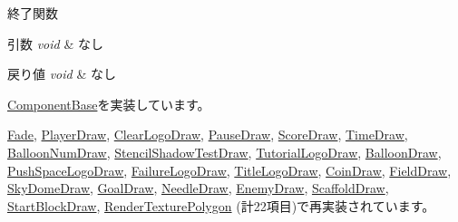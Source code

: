 終了関数 


\begin{DoxyParams}{引数}
{\em void} & なし \\
\hline
\end{DoxyParams}

\begin{DoxyRetVals}{戻り値}
{\em void} & なし \\
\hline
\end{DoxyRetVals}


\mbox{\hyperlink{class_component_base_a9f42beaf0383d6f629819579cab4de57}{Component\+Base}}を実装しています。



\mbox{\hyperlink{class_fade_ae77d06811869d3c8162a42c3e0e14f7f}{Fade}}, \mbox{\hyperlink{class_player_draw_a917b2947914287f23d87ca75cd68f553}{Player\+Draw}}, \mbox{\hyperlink{class_clear_logo_draw_aa73db5b701e644f8e552ddb254a0a9aa}{Clear\+Logo\+Draw}}, \mbox{\hyperlink{class_pause_draw_a2723bac62bfe180cc8af3c68948db376}{Pause\+Draw}}, \mbox{\hyperlink{class_score_draw_aad744f8a7a1202e6ba8117c660f297ee}{Score\+Draw}}, \mbox{\hyperlink{class_time_draw_abcfea17acdc56d251e680e926da001fc}{Time\+Draw}}, \mbox{\hyperlink{class_balloon_num_draw_a178dd82afc9c554729b66ccfe65ad212}{Balloon\+Num\+Draw}}, \mbox{\hyperlink{class_stencil_shadow_test_draw_ad0672bf4ecfc8091cf54ed6f2c76b618}{Stencil\+Shadow\+Test\+Draw}}, \mbox{\hyperlink{class_tutorial_logo_draw_a949fb70954e3df28f87b8ed5c61bf8f1}{Tutorial\+Logo\+Draw}}, \mbox{\hyperlink{class_balloon_draw_a9c38865af6eb74b163fcdd6204c42e3e}{Balloon\+Draw}}, \mbox{\hyperlink{class_push_space_logo_draw_a79021c1df43968d6008de74126d53fba}{Push\+Space\+Logo\+Draw}}, \mbox{\hyperlink{class_failure_logo_draw_a97646253380b54f37565650e211f33cd}{Failure\+Logo\+Draw}}, \mbox{\hyperlink{class_title_logo_draw_a07bbf9e8de5c7b9ee028408496c13c50}{Title\+Logo\+Draw}}, \mbox{\hyperlink{class_coin_draw_a6484c22a5598e298f18e7cd6083cd551}{Coin\+Draw}}, \mbox{\hyperlink{class_field_draw_a89a78212c141714d9e39e25e663aaeff}{Field\+Draw}}, \mbox{\hyperlink{class_sky_dome_draw_aee1c6b102a97033073b2559b8c2c328b}{Sky\+Dome\+Draw}}, \mbox{\hyperlink{class_goal_draw_a01318a0606848a3ca8ca7b7acbf4df24}{Goal\+Draw}}, \mbox{\hyperlink{class_needle_draw_ad831a9aba09ad3932832a23301bd6143}{Needle\+Draw}}, \mbox{\hyperlink{class_enemy_draw_a2861dc0623b0be7726bc69a6a469190e}{Enemy\+Draw}}, \mbox{\hyperlink{class_scaffold_draw_a5a377eb53b13402bf788d13c9b6492b2}{Scaffold\+Draw}}, \mbox{\hyperlink{class_start_block_draw_aee2e80725c15a65d085a7effb2a556f4}{Start\+Block\+Draw}}, \mbox{\hyperlink{class_render_texture_polygon_a3ff2fc37bb953074a5ab8a0dde7aaa1c}{Render\+Texture\+Polygon}} (計22項目)で再実装されています。



